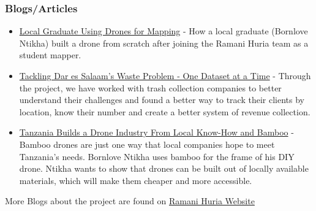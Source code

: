 \documentclass[a4paper,12pt,twoside]{article}
\begin{document}
\subsubsection {Blogs/Articles}
\bigskip
\begin{mdframed}[hidealllines=true,backgroundcolor=RHgreen!10,innerleftmargin=6pt,innerrightmargin=6pt,leftmargin=-3pt,rightmargin=-3pt]
\begin{itemize}
    \item \href{https://www.thecitizen.co.tz/magazine/success/-Local-graduate-using-drones-for-mapping/1843788-4967500-c6pj0rz/index.html}{Local Graduate Using Drones for Mapping}
- How a local graduate (Bornlove Ntikha) built a drone from scratch after joining the Ramani Huria team as a student mapper.
    \item \href{https://www.ippmedia.com/en/features/hot-tackles-dar-es-salaamE28099s-waste-problem-one-dataset-time}{Tackling Dar es Salaam’s Waste Problem - One Dataset at a Time} 
- Through the project, we have worked with trash collection companies to better understand their challenges and found a better way to track their clients by location, know their number and create a better system of revenue collection.
    \item \href{https://spectrum.ieee.org/robotics/drones/tanzanias-homegrown-drone-industry-takes-off-on-bamboo-wings}{ Tanzania Builds a Drone Industry From Local Know-How and Bamboo}
- Bamboo drones are just one way that local companies hope to meet Tanzania’s needs. Bornlove Ntikha uses bamboo for the frame of his DIY drone. Ntikha wants to show that drones can be built out of locally available materials, which will make them cheaper and more accessible.
\end{itemize}
\end{mdframed}

More Blogs about the project are found on \href{http://ramanihuria.org/news/}{Ramani Huria Website}

\newpage
\end{document}
